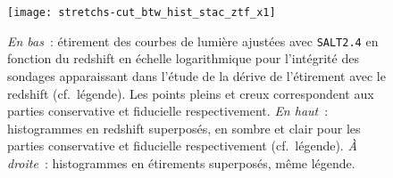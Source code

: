 \documentclass[../main/main.tex]{subfiles}
\begin{document}
\vfill
\begin{figure}[ht!]
    \centerfloat
    \texttt{[image: stretchs-cut\_btw\_hist\_stac\_ztf\_x1]}
    \caption[Présentation des données d'étirement en fonction du redshift pour
    l'échantillon de base combiné aux données de ZTF]{\textit{En bas}~:
        étirement des courbes de lumière ajustées avec \textsc{\texttt{SALT2.4}}
        en fonction du redshift en échelle logarithmique pour l'intégrité des
        sondages apparaissant dans l'étude de la dérive de l'étirement avec le
        redshift (cf.~légende). Les points pleins et creux  correspondent aux
        parties conservative et fiducielle  respectivement. \textit{En haut}~:
        histogrammes en redshift superposés, en sombre et clair pour les parties
        conservative et fiducielle respectivement (cf.\ légende). \textit{À
        droite}~: histogrammes en étirements superposés, même
    légende.}\label{fig:zsample}
\end{figure}
\vfill

\clearpage

\thispagestyle{plain}
\vfill
\minilof
\vfill
\minilot
\vfill

% 
% 
\end{document}
